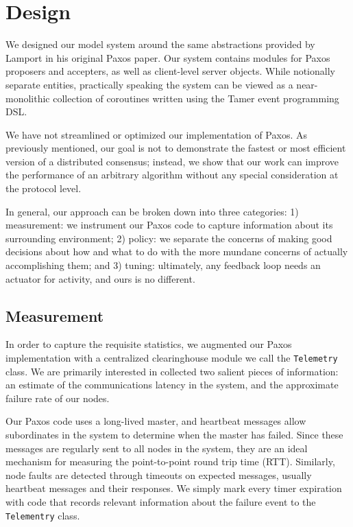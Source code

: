 
\newcommand{\Tbf}{T_{\mathit{bf}}}
\newcommand{\Thb}{T_{\mathit{hb}}}
\newcommand{\Tto}{T_{\mathit{to}}}
\newcommand{\Tl}{T_{\mathit{l}}}
\newcommand{\Cr}{C_{\mathit{r}}}
\newcommand{\Chb}{C_{\mathit{hb}}}
\newcommand{\Pff}{P_{\mathit{ff}}}
\newcommand{\Ptf}{P_{\mathit{tf}}}

\section{Design}
We designed our model system around the same abstractions provided by Lamport in his original Paxos paper.
Our system contains modules for Paxos proposers and accepters, as well as client-level server objects.
While notionally separate entities, practically speaking the system can be viewed as a near-monolithic collection of coroutines written using the Tamer \cite{Krohn07} event programming DSL.

We have not streamlined or optimized our implementation of Paxos.
As previously mentioned, our goal is not to demonstrate the fastest or most efficient version of a distributed consensus;
instead, we show that our work can improve the performance of an arbitrary algorithm without any special consideration at the protocol level.

In general, our approach can be broken down into three categories:
1) measurement: we instrument our Paxos code to capture information about its surrounding environment;
2) policy: we separate the concerns of making good decisions about how and what to do with the more mundane concerns of actually accomplishing them;
and 3) tuning: ultimately, any feedback loop needs an actuator for activity, and ours is no different.

\subsection{Measurement}
In order to capture the requisite statistics, we augmented our Paxos implementation with a centralized clearinghouse module we call the \texttt{Telemetry} class.
We are primarily interested in collected two salient pieces of information:
an estimate of the communications latency in the system, and the approximate failure rate of our nodes.

Our Paxos code uses a long-lived master, and heartbeat messages allow subordinates in the system to determine when the master has failed.
Since these messages are regularly sent to all nodes in the system, they are an ideal mechanism for measuring the point-to-point round trip time (RTT).
Similarly, node faults are detected through timeouts on expected messages, usually heartbeat messages and their responses.
We simply mark every timer expiration with code that records relevant information about the failure event to the \texttt{Telementry} class.

